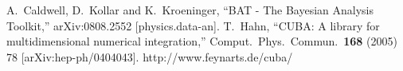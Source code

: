 \documentclass[11pt, a4paper]{article}
\begin{document}



\begin{thebibliography}{99}
  A.~Caldwell, D.~Kollar and K.~Kroeninger,
  ``BAT - The Bayesian Analysis Toolkit,''
  arXiv:0808.2552 [physics.data-an].
%
  T.~Hahn, ``CUBA: A library for multidimensional numerical
  integration,'' Comput.\ Phys.\ Commun.\ {\bf 168} (2005) 78
  [arXiv:hep-ph/0404043].
%
  http://www.feynarts.de/cuba/
\end{thebibliography}

\end{document}

